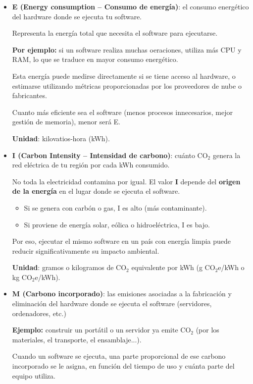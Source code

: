 \documentclass[12pt,a4paper]{report}
\begin{document}
\begin{itemize}
  \item \textbf{E (Energy consumption – Consumo de energía)}: el consumo energético del hardware donde se ejecuta tu software.

        Representa la energía total que necesita el software para ejecutarse.

        \textbf{Por ejemplo:} si un software realiza muchas oeraciones, utiliza más CPU y RAM, lo que se traduce en mayor consumo energético.

        Esta energía puede medirse directamente si se tiene acceso al hardware, o estimarse utilizando métricas proporcionadas por los proveedores de nube o fabricantes.

        Cuanto más eficiente sea el software (menos procesos innecesarios, mejor gestión de memoria), menor será E.

        \textbf{Unidad}: kilovatios-hora (kWh).

  \item \textbf{I (Carbon Intensity – Intensidad de carbono)}: cuánto CO$_2$ genera la red eléctrica de tu región por cada kWh consumido.

        No toda la electricidad contamina por igual. El valor \textbf{I} depende del \textbf{origen de la energía} en el lugar donde se ejecuta el software.

        \begin{itemize}
          \item Si se genera con carbón o gas, I es alto (más contaminante).
          \item Si proviene de energía solar, eólica o hidroeléctrica, I es bajo.
        \end{itemize}

        Por eso, ejecutar el mismo software en un país con energía limpia puede reducir significativamente su impacto ambiental.

        \textbf{Unidad}: gramos o kilogramos de CO$_2$ equivalente por kWh (g CO$_2$e/kWh o kg CO$_2$e/kWh).

  \item \textbf{M (Carbono incorporado)}: las emisiones asociadas a la fabricación y eliminación del hardware donde se ejecuta el software (servidores, ordenadores, etc.)

        \textbf{Ejemplo:} construir un portátil o un servidor ya emite CO$_2$ (por los materiales, el transporte, el ensamblaje...).

        Cuando un software se ejecuta, una parte proporcional de ese carbono incorporado se le asigna, en función del tiempo de uso y cuánta parte del equipo utiliza.


\end{itemize}
\end{document}
